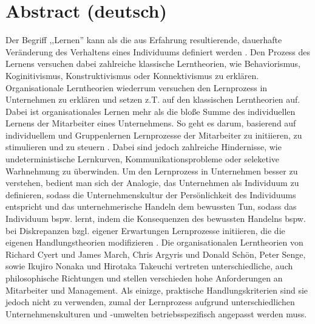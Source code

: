 \documentclass[12pt]{article}
\begin{document}
\maketitle

\section{Abstract (deutsch)}

Der Begriff ,,Lernen'' kann als die aus Erfahrung resultierende, dauerhafte
Veränderung des Verhaltens eines Individuums definiert werden
\cite{Lefrancois:2006}. Den Prozess des Lernens versuchen dabei zahlreiche
klassische Lerntheorien, wie Behaviorismus, Koginitivismus, Konstruktivismus
oder Konnektivismus zu erklären. Organisationale Lerntheorien wiederrum
versuchen den Lernprozess in Unternehmen zu erklären und setzen z.T. auf den
klassischen Lerntheorien auf. Dabei ist organisationales Lernen mehr als die
bloße Summe des individuellen Lernens der Mitarbeiter eines Unternehmens. So
geht es darum, basierend auf individuellem und Gruppenlernen Lernprozesse der
Mitarbeiter zu initiieren, zu stimulieren und zu steuern \cite{Franken:2002}.
Dabei sind jedoch zahlreiche Hindernisse, wie undeterministische Lernkurven,
Kommunikationsprobleme oder seleketive Warhnehmung zu überwinden. Um den
Lernprozess in Unternehmen besser zu verstehen, bedient man sich der Analogie,
das Unternehmen als Individuum zu definieren, sodass die Unternehmenskultur der
Persönlichkeit des Individuums entspricht und das unternehmerische Handeln dem
bewussten Tun, sodass das Individuum bspw. lernt, indem die Konsequenzen des
bewussten Handelns bspw. bei Diskrepanzen bzgl. eigener Erwartungen
Lernprozesse initiieren, die die eigenen Handlungstheorien modifizieren
\cite{Pawlowsky:1992}. Die organisationalen Lerntheorien von Richard Cyert und
James March, Chris Argyris und Donald Schön, Peter Senge, sowie Ikujiro Nonaka
und Hirotaka Takeuchi vertreten unterschiedliche, auch philosophische
Richtungen und stellen verschieden hohe Anforderungen an Mitarbeiter und
Management. Als einizge, praktische Handlungskriterien sind sie jedoch nicht zu
verwenden, zumal der Lernprozess aufgrund unterschiedlichen
Unternehmenskulturen und -umwelten betriebsspezifisch angepasst werden muss.
\end{document}

